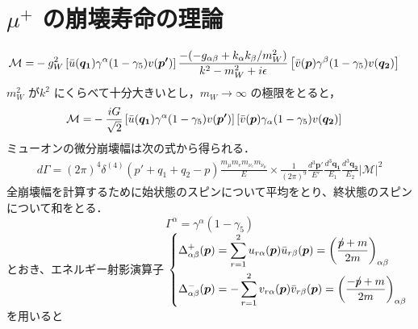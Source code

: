 



%

\section{$\mu^{+}$ の崩壊寿命の理論}%

\begin{align}
\mathcal{M} = &-g_{W}^2\left[\Bar{u}(\bm{q_{1}})\gamma^{\alpha}(1 - \gamma_{5})v(\bm{p'})\right]
\frac{-(-g_{\alpha\beta} + k_{\alpha}k_{\beta}/m_{W}^2)}{k^{2} - m_{W}^2 + i\epsilon}\left[\Bar{v}(\bm{p})\gamma^{\beta}(1 - \gamma_5)v(\bm{q_{2}})\right]
\end{align}
%
$m_{W}^2$ が$k^2$ にくらべて十分大きいとし，$m_{W} \rightarrow \infty$ の極限をとると，
%
\begin{align}
\mathcal{M} = &-\frac{iG}{\sqrt{2}}\left[\Bar{u}(\bm{q_{1}})\gamma^{\alpha}(1 - \gamma_{5})v(\bm{p'})\right]
\left[\Bar{v}(\bm{p})\gamma_{\alpha}(1 - \gamma_5)v(\bm{q_{2}})\right]
\end{align}
%
ミューオンの微分崩壊幅は次の式から得られる．
%
\begin{align}
d\Gamma = (2\pi)^{4}\delta^{(4)}(p'+q_{1}+q_{2}-p)\frac{m_{\mu}m_{e}m_{\nu_{e}}m_{\nu_{\mu}}}{E}\times\frac{1}{(2\pi)^9}\frac{d^3\bm{p'}}{E'}
\frac{d^3\bm{q_{1}}}{E_{1}}\frac{d^3\bm{q_{2}}}{E_{2}}|\mathcal{M}|^{2}\label{eq:decay}
\end{align}
%
全崩壊幅を計算するために始状態のスピンについて平均をとり、終状態のスピンについて和をとる．
\[\Gamma^{\alpha}=\gamma^{\alpha}(1 - \gamma_{5})\]
%
とおき、エネルギー射影演算子
$\begin{dcases}
\Delta^{+}_{\alpha\beta}(\bm{p})=\sum_{r=1}^{2}u_{r\alpha}(\bm{p})\bar{u}_{r\beta}(\bm{p})=\left(\frac{\Slash{p}+m}{2m}\right)_{\alpha\beta}\\
\Delta^{-}_{\alpha\beta}(\bm{p})=-\sum_{r=1}^{2}v_{r\alpha}(\bm{p})\bar{v}_{r\beta}(\bm{p})=\left(\frac{-\Slash{p}+m}{2m}\right)_{\alpha\beta}
\end{dcases}$
を用いると
%
